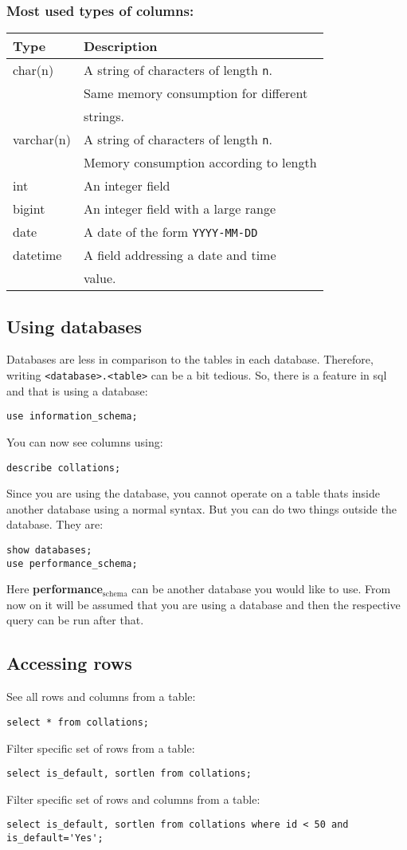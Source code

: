 \documentclass[11pt]{article}
\begin{document}
\subsubsection{Most used types of columns:}
\label{sec:org23c0eed}
\begin{center}
\begin{tabular}{ll}
Type & Description\\
\hline
char(n) & A string of characters of length \texttt{n}.\\
 & Same memory consumption for different\\
 & strings.\\
varchar(n) & A string of characters of length \texttt{n}.\\
 & Memory consumption according to length\\
int & An integer field\\
bigint & An integer field with a large range\\
date & A date of the form \texttt{YYYY-MM-DD}\\
datetime & A field addressing a date and time\\
 & value.\\
\end{tabular}
\end{center}
\subsection{Using databases}
\label{sec:org8226490}
Databases are less in comparison to the tables in
each database. Therefore, writing \texttt{<database>.<table>}
can be a bit tedious. So, there is a feature in sql
and that is using a database:
\begin{verbatim}
use information_schema;
\end{verbatim}
You can now see columns using:
\begin{verbatim}
describe collations;
\end{verbatim}
Since you are using the database, you cannot operate
on a table thats inside another database using a normal
syntax.
But you can do two things outside the database. 
They are:
\begin{verbatim}
show databases;
use performance_schema;
\end{verbatim}
Here \textbf{performance\(_{\text{schema}}\)} can be another database you
would like to use.
From now on it will be assumed that you are using a
database and then the respective query can be run after
that.
\subsection{Accessing rows}
\label{sec:orgedac794}
See all rows and columns from a table:
\begin{verbatim}
select * from collations;
\end{verbatim}
Filter specific set of rows from a table:
\begin{verbatim}
select is_default, sortlen from collations;
\end{verbatim}
Filter specific set of rows and columns from a table:
\begin{verbatim}
select is_default, sortlen from collations where id < 50 and is_default='Yes';
\end{verbatim}
\end{document}

